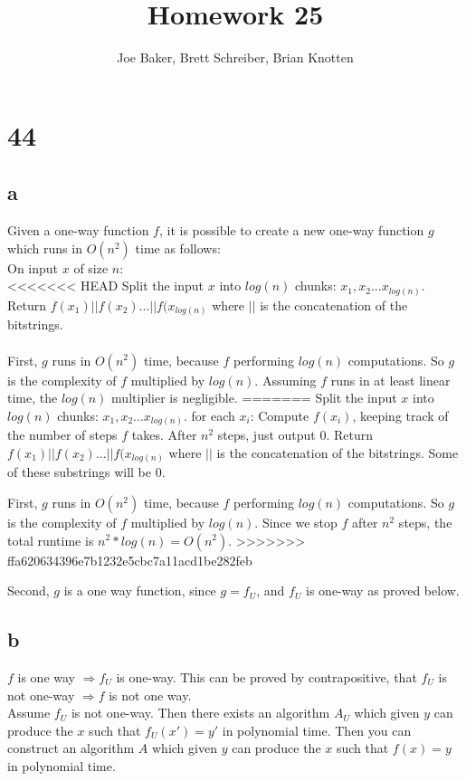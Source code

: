 \documentclass[letterpaper,notitlepage,twoside]{article}
\renewcommand{\implies}{\Rightarrow} %
\newcommand\tab[1][1cm]{\hspace*{#1}} %
\begin{document}
\title{Homework 25}
\author{Joe Baker, Brett Schreiber, Brian Knotten}
\maketitle

\section*{44}
\subsection*{a}
Given a one-way function $f$, it is possible to create a new one-way function $g$ which runs in $O(n^2)$ time as follows: \\
On input $x$ of size $n$: \\
<<<<<<< HEAD
\tab Split the input $x$ into $log(n)$ chunks: $x_1, x_2...x_{log(n)}$. \\
\tab Return $f(x_1) || f(x_2) ... || f(x_{log(n)}$ where $||$ is the concatenation of the bitstrings. \\\\
First, $g$ runs in $O(n^2)$ time, because $f$ performing $log(n)$ computations. So $g$ is the complexity of $f$ multiplied by $log(n)$. Assuming $f$ runs in at least linear time, the $log(n)$ multiplier is negligible.
=======
\tab Split the input $x$ into $log(n)$ chunks: $x_1, x_2...x_{log(n)}$.
\tab for each $x_i$:
\tab \tab Compute $f(x_i)$, keeping track of the number of steps $f$ takes. After $n^2$ steps, just output $0$.
\tab Return $f(x_1) || f(x_2) ... || f(x_{log(n)}$ where $||$ is the concatenation of the bitstrings. Some of these substrings will be $0$.

First, $g$ runs in $O(n^2)$ time, because $f$ performing $log(n)$ computations. So $g$ is the complexity of $f$ multiplied by $log(n)$. Since we stop $f$ after $n^2$ steps, the total runtime is $n^2 * log(n) = O(n^2)$.
>>>>>>> ffa620634396e7b1232e5cbc7a11acd1be282feb

Second, $g$ is a one way function, since $g = f_U$, and $f_U$ is one-way as proved below.

\subsection*{b}
$f$ is one way $\implies f_U$ is one-way. This can be proved by contrapositive, that $f_U$ is not one-way $\implies f$ is not one way. \\
Assume $f_U$ is not one-way. Then there exists an algorithm $A_U$ which given $y$ can produce the $x$ such that $f_U(x') = y'$ in polynomial time. Then you can construct an algorithm $A$ which given $y$ can produce the $x$ such that $f(x) = y$ in polynomial time.
\end{document}
